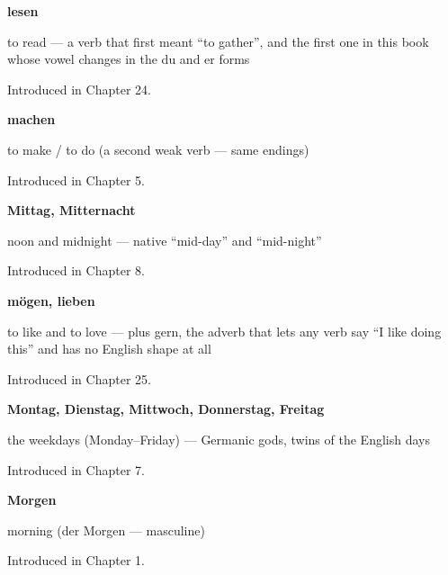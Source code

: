 \noindent\begin{minipage}[t]{\linewidth}
\raggedright
\textbf{lesen}\par
\small to read — a verb that first meant \textquotedblleft{}to gather\textquotedblright{}, and the first one in this book whose vowel changes in the du and er forms\par
\footnotesize Introduced in Chapter 24.
\end{minipage}\par\medskip

\noindent\begin{minipage}[t]{\linewidth}
\raggedright
\textbf{machen}\par
\small to make / to do (a second weak verb — same endings)\par
\footnotesize Introduced in Chapter 5.
\end{minipage}\par\medskip

\noindent\begin{minipage}[t]{\linewidth}
\raggedright
\textbf{Mittag, Mitternacht}\par
\small noon and midnight — native \textquotedblleft{}mid-day\textquotedblright{} and \textquotedblleft{}mid-night\textquotedblright{}\par
\footnotesize Introduced in Chapter 8.
\end{minipage}\par\medskip

\noindent\begin{minipage}[t]{\linewidth}
\raggedright
\textbf{mögen, lieben}\par
\small to like and to love — plus gern, the adverb that lets any verb say \textquotedblleft{}I like doing this\textquotedblright{} and has no English shape at all\par
\footnotesize Introduced in Chapter 25.
\end{minipage}\par\medskip

\noindent\begin{minipage}[t]{\linewidth}
\raggedright
\textbf{Montag, Dienstag, Mittwoch, Donnerstag, Freitag}\par
\small the weekdays (Monday–Friday) — Germanic gods, twins of the English days\par
\footnotesize Introduced in Chapter 7.
\end{minipage}\par\medskip

\noindent\begin{minipage}[t]{\linewidth}
\raggedright
\textbf{Morgen}\par
\small morning (der Morgen — masculine)\par
\footnotesize Introduced in Chapter 1.
\end{minipage}\par\medskip

